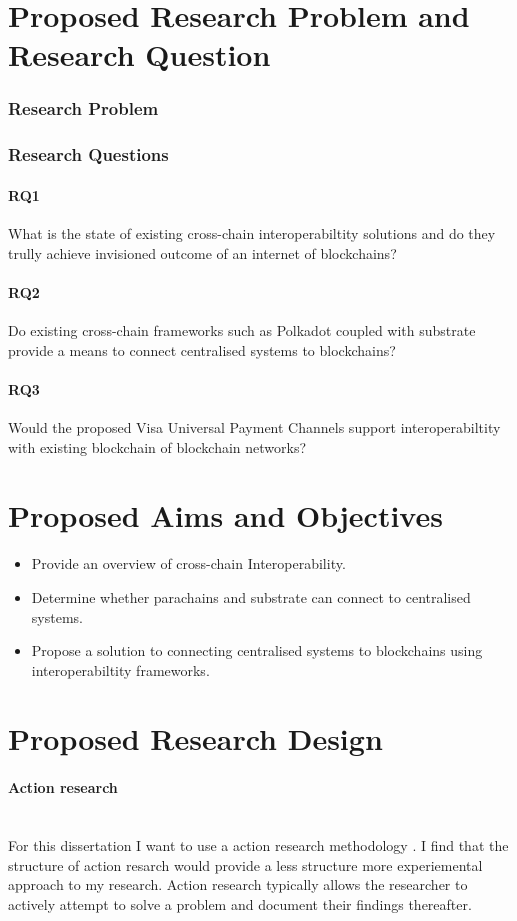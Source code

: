 \documentclass[12pt]{article}
\begin{document}
\section{Proposed Research Problem and Research Question}
\subsubsection{Research Problem}

\subsubsection{Research Questions}
\paragraph{RQ1} What is the state of existing cross-chain interoperabiltity solutions and do they trully achieve invisioned outcome of an internet of blockchains? 
\paragraph{RQ2} Do existing cross-chain frameworks such as Polkadot coupled with substrate provide a means to connect centralised systems to blockchains? 
\paragraph{RQ3} Would the proposed Visa Universal Payment Channels support interoperabiltity with existing blockchain of blockchain networks?

\section{Proposed Aims and Objectives}
\begin{itemize}
    \item Provide an overview of cross-chain Interoperability.
    \item Determine whether parachains and substrate can connect to centralised systems.
    \item Propose a solution to connecting centralised systems to blockchains using interoperabiltity frameworks.
\end{itemize}

\section{Proposed Research Design}
\paragraph{Action research}\mbox{} \\
For this dissertation I want to use a action research methodology \autocite{10.5555/2842927}. I find that the structure of action resarch would provide a 
less structure more experiemental approach to my research. Action research typically allows the researcher to actively attempt to solve a problem and document their findings thereafter.
\end{document}
